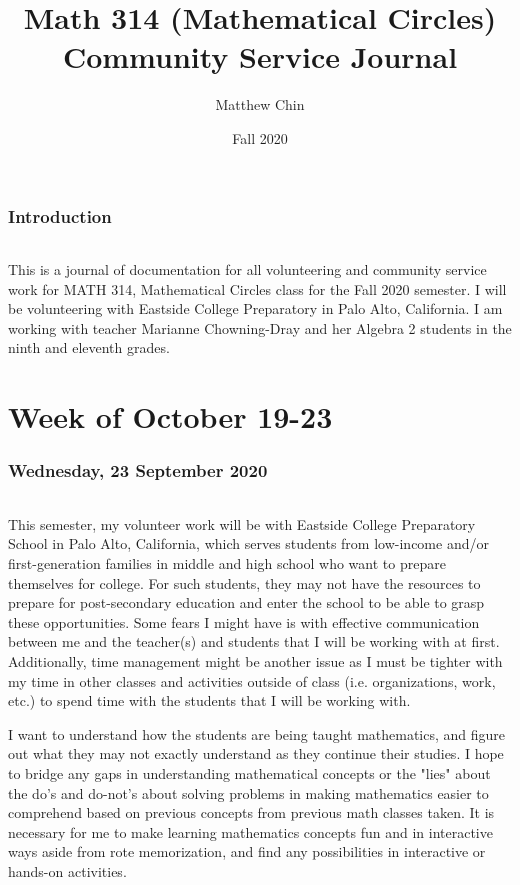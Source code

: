 \documentclass{article}
\title{Math 314 (Mathematical Circles) Community Service Journal}
\author{Matthew Chin}
\date{Fall 2020}
\begin{document}
\maketitle
\tableofcontents


\newpage
\section{Introduction}
\paragraph{}This is a journal of documentation for all volunteering and community service work for MATH 314, Mathematical Circles class for the Fall 2020 semester. I will be volunteering with Eastside College Preparatory in Palo Alto, California. I am working with teacher Marianne Chowning-Dray and her Algebra 2 students in the ninth and eleventh grades.

\part{Week of October 19-23}
\section{Wednesday, 23 September 2020}
\paragraph{} This semester, my volunteer work will be with Eastside College Preparatory School in Palo Alto, California, which serves students from low-income and/or first-generation families in middle and high school who want to prepare themselves for college. For such students, they may not have the resources to prepare for post-secondary education and enter the school to be able to grasp these opportunities. Some fears I might have is with effective communication between me and the teacher(s) and students that I will be working with at first. Additionally, time management might be another issue as I must be tighter with my time in other classes and activities outside of class (i.e. organizations, work, etc.) to spend time with the students that I will be working with. 

I want to understand how the students are being taught mathematics, and figure out what they may not exactly understand as they continue their studies. I hope to bridge any gaps in understanding mathematical concepts or the "lies" about the do's and do-not's about solving problems in making mathematics easier to comprehend based on previous concepts from previous math classes taken. It is necessary for me to make learning mathematics concepts fun and in interactive ways aside from rote memorization, and find any possibilities in interactive or hands-on activities. 
\end{document}
